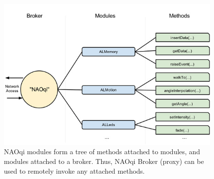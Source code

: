 \begin{figure}
	[h] \centering 
	\includegraphics[width=120mm]{figures/content/nao-proxy.jpg} \caption{NAOqi modules form a tree of methods attached to modules, and modules attached to a broker. Thus, NAOqi Broker (proxy) can be used to remotely invoke any attached methods. \cite{8} } \label{fg:nao:proxy} 
\end{figure}
